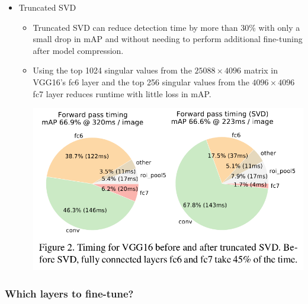 \documentclass[11pt]{article}
\begin{document}
\begin{itemize}

\item Truncated SVD\\
\label{sec-1-3-4-1}%
\begin{itemize}
\item Truncated SVD can reduce detection time by more than 30\% with only a small drop 
       in mAP and without needing to perform additional fine-tuning after model compression.
\item Using the top 1024 singular values from the $25088\times{4096}$ matrix in VGG16's fc6 layer
       and the top 256 singular values from the $4096\times{4096}$ fc7 layer reduces runtime
       with little loss in mAP.

       \includegraphics[width=.9\linewidth]{./pic_fast_rcnn/2.png}
\end{itemize}


\end{itemize} %
\subsubsection{Which layers to fine-tune?}
\label{sec-1-3-5}
\end{document}
